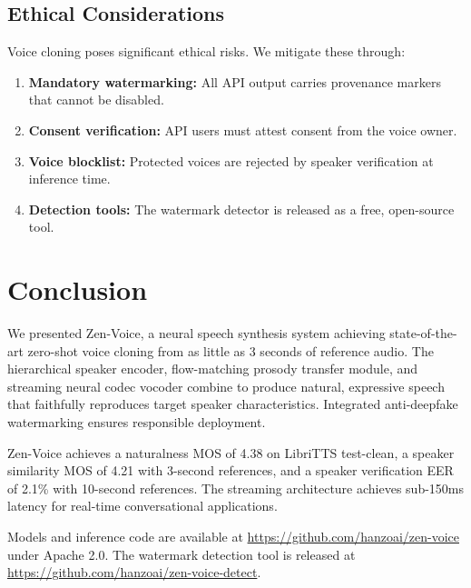 \documentclass[11pt,a4paper]{article}
\begin{document}
\subsection{Ethical Considerations}

Voice cloning poses significant ethical risks. We mitigate these through:
\begin{enumerate}
    \item \textbf{Mandatory watermarking:} All API output carries provenance markers that cannot be disabled.
    \item \textbf{Consent verification:} API users must attest consent from the voice owner.
    \item \textbf{Voice blocklist:} Protected voices are rejected by speaker verification at inference time.
    \item \textbf{Detection tools:} The watermark detector is released as a free, open-source tool.
\end{enumerate}

\section{Conclusion}
\label{sec:conclusion}

We presented Zen-Voice, a neural speech synthesis system achieving state-of-the-art zero-shot voice cloning from as little as 3 seconds of reference audio. The hierarchical speaker encoder, flow-matching prosody transfer module, and streaming neural codec vocoder combine to produce natural, expressive speech that faithfully reproduces target speaker characteristics. Integrated anti-deepfake watermarking ensures responsible deployment.

Zen-Voice achieves a naturalness MOS of 4.38 on LibriTTS test-clean, a speaker similarity MOS of 4.21 with 3-second references, and a speaker verification EER of 2.1\% with 10-second references. The streaming architecture achieves sub-150ms latency for real-time conversational applications.

Models and inference code are available at \url{https://github.com/hanzoai/zen-voice} under Apache 2.0. The watermark detection tool is released at \url{https://github.com/hanzoai/zen-voice-detect}.
\end{document}
